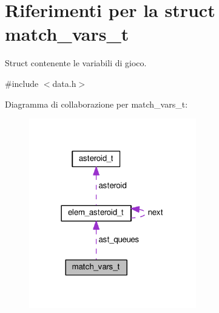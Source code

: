\hypertarget{structmatch__vars__t}{}\section{Riferimenti per la struct match\+\_\+vars\+\_\+t}
\label{structmatch__vars__t}


Struct contenente le variabili di gioco.  




{\ttfamily \#include $<$data.\+h$>$}



Diagramma di collaborazione per match\+\_\+vars\+\_\+t\+:\nopagebreak
\begin{figure}[H]
\begin{center}
\leavevmode
\includegraphics[width=206pt]{d2/db7/structmatch__vars__t__coll__graph}
\end{center}
\end{figure}
